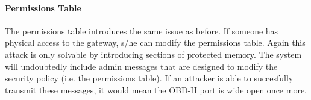 \paragraph{Permissions Table} The permissions table introduces the same issue as before. If someone has physical access to the gateway, s/he can modify the permissions table. Again this attack is only solvable by introducing sections of protected memory. The system will undoubtedly include admin messages that are designed to modify the security policy (i.e. the permissions table). If an attacker is able to succesfully transmit these messages, it would mean the OBD-II port is wide open once more.
 




  